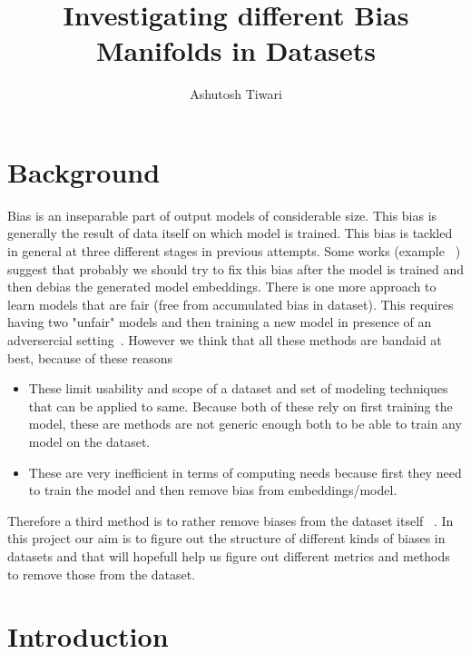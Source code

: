 \documentclass[sigconf,authordraft]{acmart}
\begin{document}
\title{Investigating different Bias Manifolds in Datasets}
\author{Ashutosh Tiwari}


\maketitle

\section{Background}

Bias is an inseparable part of output models of considerable size. This bias is generally the result of data itself on which model is trained. This bias is tackled in general at three different stages in previous attempts. Some works (example ~\cite{DBLP:journals/corr/BolukbasiCZSK16a}) suggest that probably we should try to fix this bias after the model is trained and then debias the generated model embeddings. There is one more approach to learn models  that are fair (free from accumulated bias in dataset). This requires having two "unfair" models and then training a new model in presence of an adversercial setting~\cite{kenna_using_2021}. However we think that all these methods are bandaid at best, because of these reasons \begin{itemize}
    \item These limit usability and scope of a dataset and set of modeling techniques that can be applied to same. Because both of these rely on first training the model, these are methods are not generic enough both to be able to train any model on the dataset.
    \item These are very inefficient in terms of computing needs because first they need to train the model and then remove bias from embeddings/model.

\end{itemize}

Therefore a third method is to rather remove biases from the dataset itself ~\cite{ravfogel_null_2020}. In this project our aim is to figure out the structure of different kinds of biases in datasets and that will hopefull help us figure out different metrics and methods to remove those from the dataset.

\section{Introduction}
\end{document}
